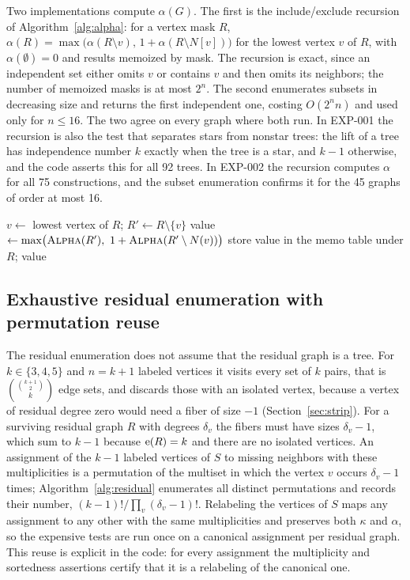 Two implementations compute $\alpha(G)$.
The first is the include/exclude recursion of Algorithm~\ref{alg:alpha}: for a vertex mask $R$, $\alpha(R)=\max\bigl(\alpha(R\setminus v),\,1+\alpha(R\setminus N[v])\bigr)$ for the lowest vertex $v$ of $R$, with $\alpha(\emptyset)=0$ and results memoized by mask.
The recursion is exact, since an independent set either omits $v$ or contains $v$ and then omits its neighbors; the number of memoized masks is at most $2^n$.
The second enumerates subsets in decreasing size and returns the first independent one, costing $O(2^nn)$ and used only for $n\le16$.
The two agree on every graph where both run.
In EXP-001 the recursion is also the test that separates stars from nonstar trees: the lift of a tree has independence number $k$ exactly when the tree is a star, and $k-1$ otherwise, and the code asserts this for all 92 trees.
In EXP-002 the recursion computes $\alpha$ for all 75 constructions, and the subset enumeration confirms it for the 45 graphs of order at most 16.

\begin{algorithm}[t]
\caption{Independence number by include/exclude recursion with memoization (EXP-001, \texttt{independent\_number})}\label{alg:alpha}
$v\leftarrow$ lowest vertex of $R$; $R'\leftarrow R\setminus\{v\}$\;
value $\leftarrow\max\bigl(\textsc{Alpha}(R'),\ 1+\textsc{Alpha}(R'\setminus N(v))\bigr)$\;
store value in the memo table under $R$; \Return value\;
\end{algorithm}

\subsection{Exhaustive residual enumeration with permutation reuse}\label{sec:comp-residual}

The residual enumeration does not assume that the residual graph is a tree.
For $k\in\{3,4,5\}$ and $n=k+1$ labeled vertices it visits every set of $k$ pairs, that is $\binom{\binom{k+1}2}{k}$ edge sets, and discards those with an isolated vertex, because a vertex of residual degree zero would need a fiber of size $-1$ (Section~\ref{sec:strip}).
For a surviving residual graph $R$ with degrees $\delta_v$ the fibers must have sizes $\delta_v-1$, which sum to $k-1$ because $\mathrm{e}(R)=k$ and there are no isolated vertices.
An assignment of the $k-1$ labeled vertices of $S$ to missing neighbors with these multiplicities is a permutation of the multiset in which the vertex $v$ occurs $\delta_v-1$ times; Algorithm~\ref{alg:residual} enumerates all distinct permutations and records their number, $(k-1)!/\prod_v(\delta_v-1)!$.
Relabeling the vertices of $S$ maps any assignment to any other with the same multiplicities and preserves both $\kappa$ and $\alpha$, so the expensive tests are run once on a canonical assignment per residual graph.
This reuse is explicit in the code: for every assignment the multiplicity and sortedness assertions certify that it is a relabeling of the canonical one.

